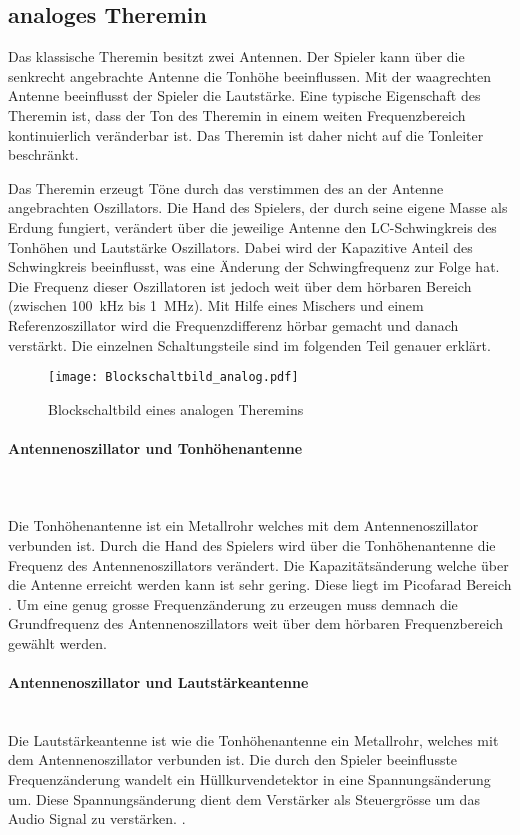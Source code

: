 \subsection{analoges Theremin}\label{subsec:Theremin_analog}
Das klassische Theremin besitzt zwei Antennen. Der Spieler kann über die senkrecht angebrachte Antenne  die  Tonhöhe beeinflussen. Mit der waagrechten Antenne beeinflusst der Spieler die Lautstärke. Eine typische Eigenschaft des Theremin ist, dass der Ton des Theremin in einem weiten Frequenzbereich kontinuierlich veränderbar ist. Das Theremin ist daher nicht auf die Tonleiter beschränkt.

Das Theremin erzeugt Töne durch das verstimmen des an der Antenne angebrachten Oszillators.
 Die Hand des Spielers, der durch seine eigene Masse als Erdung fungiert, verändert über die jeweilige Antenne den LC-Schwingkreis des Tonhöhen und Lautstärke Oszillators. Dabei wird der Kapazitive Anteil des Schwingkreis beeinflusst, was eine Änderung der Schwingfrequenz zur Folge hat. 
 Die Frequenz dieser Oszillatoren ist jedoch weit über dem hörbaren Bereich (zwischen \SI{100}{kHz} bis \SI{1}{MHz}). Mit Hilfe eines Mischers und einem Referenzoszillator wird die Frequenzdifferenz hörbar gemacht und danach verstärkt\cite{Franzis}. Die einzelnen Schaltungsteile sind im folgenden Teil genauer erklärt.

\begin{figure}[h]
	\centering
	\texttt{[image: Blockschaltbild\_analog.pdf]}
	\caption{Blockschaltbild eines analogen Theremins}
	\label{img:Blockschaltbild_analog}
\end{figure}

\paragraph{Antennenoszillator und Tonhöhenantenne}\mbox{}\\ 
\\Die Tonhöhenantenne ist ein Metallrohr welches mit dem Antennenoszillator verbunden ist.
Durch die Hand des Spielers wird über die Tonhöhenantenne die Frequenz des Antennenoszillators verändert. Die Kapazitätsänderung welche über die Antenne erreicht werden kann ist sehr gering. Diese liegt im Picofarad Bereich \cite{physik_theremin}. Um eine genug grosse Frequenzänderung zu erzeugen muss demnach die Grundfrequenz des Antennenoszillators weit über dem hörbaren Frequenzbereich gewählt werden. 

\paragraph{Antennenoszillator und Lautstärkeantenne}\mbox{}\\ 
Die Lautstärkeantenne ist wie die Tonhöhenantenne ein Metallrohr, welches mit dem Antennenoszillator verbunden ist. Die durch den Spieler beeinflusste Frequenzänderung wandelt ein Hüllkurvendetektor in eine Spannungsänderung um. Diese Spannungsänderung dient dem Verstärker als Steuergrösse um das Audio Signal zu verstärken. \cite{Franzis}. 

